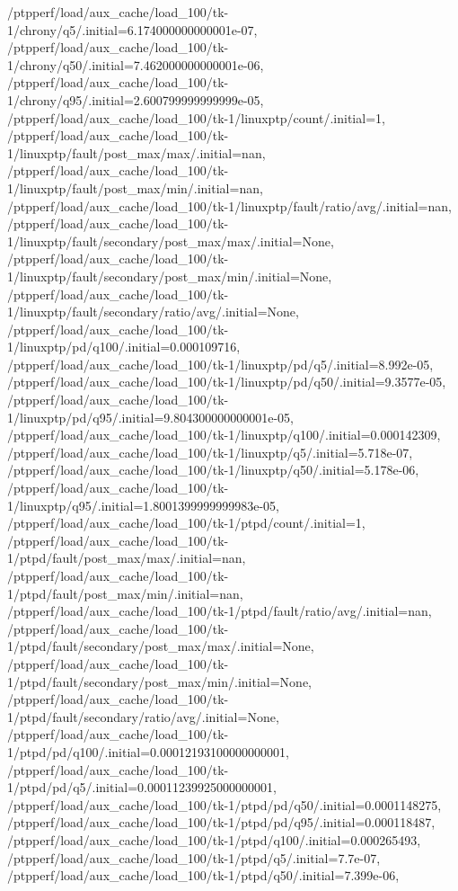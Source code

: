 {    /ptpperf/load/aux_cache/load_100/tk-1/chrony/q5/.initial=6.174000000000001e-07,
    /ptpperf/load/aux_cache/load_100/tk-1/chrony/q50/.initial=7.462000000000001e-06,
    /ptpperf/load/aux_cache/load_100/tk-1/chrony/q95/.initial=2.600799999999999e-05,
    /ptpperf/load/aux_cache/load_100/tk-1/linuxptp/count/.initial=1,
    /ptpperf/load/aux_cache/load_100/tk-1/linuxptp/fault/post_max/max/.initial=nan,
    /ptpperf/load/aux_cache/load_100/tk-1/linuxptp/fault/post_max/min/.initial=nan,
    /ptpperf/load/aux_cache/load_100/tk-1/linuxptp/fault/ratio/avg/.initial=nan,
    /ptpperf/load/aux_cache/load_100/tk-1/linuxptp/fault/secondary/post_max/max/.initial=None,
    /ptpperf/load/aux_cache/load_100/tk-1/linuxptp/fault/secondary/post_max/min/.initial=None,
    /ptpperf/load/aux_cache/load_100/tk-1/linuxptp/fault/secondary/ratio/avg/.initial=None,
    /ptpperf/load/aux_cache/load_100/tk-1/linuxptp/pd/q100/.initial=0.000109716,
    /ptpperf/load/aux_cache/load_100/tk-1/linuxptp/pd/q5/.initial=8.992e-05,
    /ptpperf/load/aux_cache/load_100/tk-1/linuxptp/pd/q50/.initial=9.3577e-05,
    /ptpperf/load/aux_cache/load_100/tk-1/linuxptp/pd/q95/.initial=9.804300000000001e-05,
    /ptpperf/load/aux_cache/load_100/tk-1/linuxptp/q100/.initial=0.000142309,
    /ptpperf/load/aux_cache/load_100/tk-1/linuxptp/q5/.initial=5.718e-07,
    /ptpperf/load/aux_cache/load_100/tk-1/linuxptp/q50/.initial=5.178e-06,
    /ptpperf/load/aux_cache/load_100/tk-1/linuxptp/q95/.initial=1.8001399999999983e-05,
    /ptpperf/load/aux_cache/load_100/tk-1/ptpd/count/.initial=1,
    /ptpperf/load/aux_cache/load_100/tk-1/ptpd/fault/post_max/max/.initial=nan,
    /ptpperf/load/aux_cache/load_100/tk-1/ptpd/fault/post_max/min/.initial=nan,
    /ptpperf/load/aux_cache/load_100/tk-1/ptpd/fault/ratio/avg/.initial=nan,
    /ptpperf/load/aux_cache/load_100/tk-1/ptpd/fault/secondary/post_max/max/.initial=None,
    /ptpperf/load/aux_cache/load_100/tk-1/ptpd/fault/secondary/post_max/min/.initial=None,
    /ptpperf/load/aux_cache/load_100/tk-1/ptpd/fault/secondary/ratio/avg/.initial=None,
    /ptpperf/load/aux_cache/load_100/tk-1/ptpd/pd/q100/.initial=0.00012193100000000001,
    /ptpperf/load/aux_cache/load_100/tk-1/ptpd/pd/q5/.initial=0.00011239925000000001,
    /ptpperf/load/aux_cache/load_100/tk-1/ptpd/pd/q50/.initial=0.0001148275,
    /ptpperf/load/aux_cache/load_100/tk-1/ptpd/pd/q95/.initial=0.000118487,
    /ptpperf/load/aux_cache/load_100/tk-1/ptpd/q100/.initial=0.000265493,
    /ptpperf/load/aux_cache/load_100/tk-1/ptpd/q5/.initial=7.7e-07,
    /ptpperf/load/aux_cache/load_100/tk-1/ptpd/q50/.initial=7.399e-06,
}
